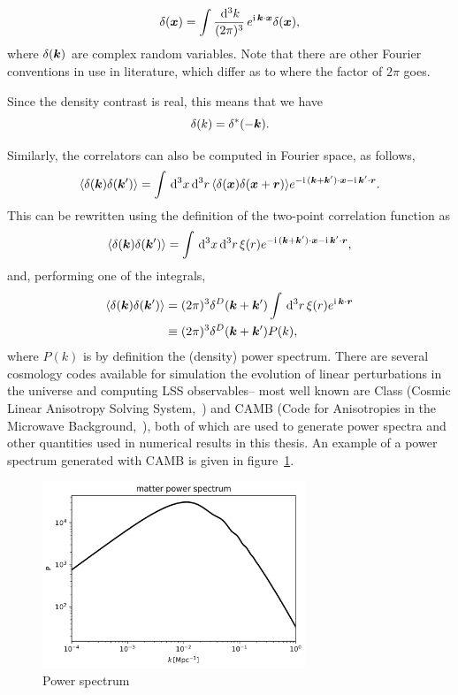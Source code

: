 \begin{equation}
	\delta({\bm {x}}) = \int \frac{\,\mathrm{d}^3k}{(2\pi)^3} \, e^{\mathrm{i\,} \bm {k} \cdot \bm {x} } \delta(\bm {x}),
\end{equation}
where $\delta(\bm {k})$ are complex random variables. Note that there are other Fourier conventions in use in literature, which differ as to where the factor of $2\pi$ goes.

Since the density contrast is real, this means that we have
\begin{equation}
	\delta(k) = \delta^*(-\bm {k}).
\end{equation}

Similarly, the correlators can also be computed in Fourier space, as follows, 
\begin{equation}
	\langle \delta(\bm {k}) \delta(\bm {k}') \rangle = \int \,\mathrm{d}^3 x \,\mathrm{d}^3 r \, \langle \delta(\bm {x}) \delta(\bm {x} + \bm{r})\rangle e^{-\mathrm{i\,} (\bm {k} + \bm {k}') \cdot \bm {x} - \mathrm{i\,} \bm {k}' \cdot \bm{r}}.
\end{equation}
This can be rewritten using the definition of the two-point correlation function as 
\begin{equation}
	\langle \delta(\bm {k}) \delta(\bm {k}') \rangle = \int \,\mathrm{d}^3 x \,\mathrm{d}^3 r \, \xi(r) e^{-\mathrm{i\,} (\bm {k} + \bm {k}') \cdot \bm {x} - \mathrm{i\,} \bm {k}' \cdot \bm{r}},
\end{equation}
and, performing one of the integrals, 
\begin{align}
	\langle \delta(\bm {k}) \delta(\bm {k}') \rangle &= (2\pi)^3 \delta^D(\bm {k} + \bm {k}') \int \,\mathrm{d}^3 r \,\xi(r) e^{\mathrm{i\,} \bm {k} \cdot \bm{r}} \\
	&\equiv (2\pi)^3 \delta^D(\bm {k} + \bm {k}') P(k),
\end{align}
where $P(k)$ is by definition the (density) power spectrum. There are several cosmology codes available for simulation the evolution of linear perturbations in the universe and computing LSS observables-- most well known are Class (Cosmic Linear Anisotropy Solving System,~\cite{Lesgourgues:2011}) and CAMB (Code for Anisotropies in the Microwave Background,~\cite{Lewis:1999bs}), both of which are used to generate power spectra and other quantities used in numerical results in this thesis. An example of a power spectrum generated with CAMB is given in figure~\ref{fig:powerspectrum}.
\begin{figure}[!ht]
	\centering
	\includegraphics[width=0.7\textwidth]{fig/placeholder_pk.png}
	\caption{Power spectrum}
	\label{fig:powerspectrum}
\end{figure}

